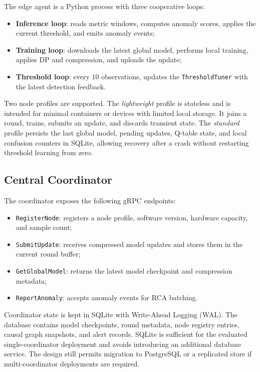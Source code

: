The edge agent is a Python process with three cooperative loops:

\begin{itemize}
    \item \textbf{Inference loop}: reads metric windows, computes anomaly
    scores, applies the current threshold, and emits anomaly events;
    \item \textbf{Training loop}: downloads the latest global model, performs
    local training, applies DP and compression, and uploads the update;
    \item \textbf{Threshold loop}: every 10 observations, updates the
    \texttt{ThresholdTuner} with the latest detection feedback.
\end{itemize}

Two node profiles are supported. The \emph{lightweight} profile is stateless and
is intended for minimal containers or devices with limited local storage. It
joins a round, trains, submits an update, and discards transient state. The
\emph{standard} profile persists the last global model, pending updates, Q-table
state, and local confusion counters in SQLite, allowing recovery after a crash
without restarting threshold learning from zero.

\subsection{Central Coordinator}
\label{subsec:design_coordinator}

The coordinator exposes the following gRPC endpoints:

\begin{itemize}
    \item \texttt{RegisterNode}: registers a node profile, software version,
    hardware capacity, and sample count;
    \item \texttt{SubmitUpdate}: receives compressed model updates and stores
    them in the current round buffer;
    \item \texttt{GetGlobalModel}: returns the latest model checkpoint and
    compression metadata;
    \item \texttt{ReportAnomaly}: accepts anomaly events for RCA batching.
\end{itemize}

Coordinator state is kept in SQLite with Write-Ahead Logging (WAL). The database
contains model checkpoints, round metadata, node registry entries, causal graph
snapshots, and alert records. SQLite is sufficient for the evaluated
single-coordinator deployment and avoids introducing an additional database
service. The design still permits migration to PostgreSQL or a replicated store
if multi-coordinator deployments are required.

